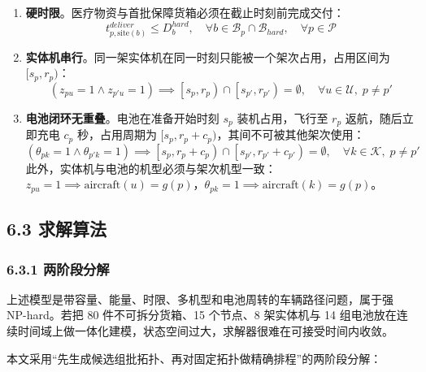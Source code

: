 \documentclass[withoutpreface,bwprint]{format}
\begin{document}
\begin{enumerate}[leftmargin=*]
    \item \textbf{硬时限}。医疗物资与首批保障货箱必须在截止时刻前完成交付：
    \begin{equation}
    t_{p, \text{site}(b)}^{deliver} \le D_b^{hard}, \quad \forall b \in \mathcal{B}_p \cap \mathcal{B}_{hard}, \quad \forall p \in \mathcal{P}
    \end{equation}

    \item \textbf{实体机串行}。同一架实体机在同一时刻只能被一个架次占用，占用区间为 $[s_p, r_p)$：
    \begin{equation}
    \left( z_{pu} = 1 \land z_{p'u} = 1 \right) \implies \left[ s_p, r_p \right) \cap \left[ s_{p'}, r_{p'} \right) = \emptyset, \quad \forall u \in \mathcal{U}, \; p \ne p'
    \label{eq:drone_no_overlap}
    \end{equation}

    \item \textbf{电池闭环无重叠}。电池在准备开始时刻 $s_p$ 装机占用，飞行至 $r_p$ 返航，随后立即充电 $c_p$ 秒，占用周期为 $[s_p, r_p + c_p)$，其间不可被其他架次使用：
    \begin{equation}
    \left( \theta_{pk} = 1 \land \theta_{p'k} = 1 \right) \implies \left[ s_p, r_p + c_p \right) \cap \left[ s_{p'}, r_{p'} + c_{p'} \right) = \emptyset, \quad \forall k \in \mathcal{K}, \; p \ne p'
    \label{eq:battery_no_overlap}
    \end{equation}
    此外，实体机与电池的机型必须与架次机型一致：$z_{pu} = 1 \implies \text{aircraft}(u) = g(p)$，$\theta_{pk} = 1 \implies \text{aircraft}(k) = g(p)$。
\end{enumerate}

\subsection{6.3 求解算法}

\subsubsection{6.3.1 两阶段分解}
上述模型是带容量、能量、时限、多机型和电池周转的车辆路径问题，属于强 NP-hard\cite{schermer2019}。若把 80 件不可拆分货箱、15 个节点、8 架实体机与 14 组电池放在连续时间域上做一体化建模，状态空间过大，求解器很难在可接受时间内收敛。

本文采用“先生成候选组批拓扑、再对固定拓扑做精确排程”的两阶段分解：
\end{document}
